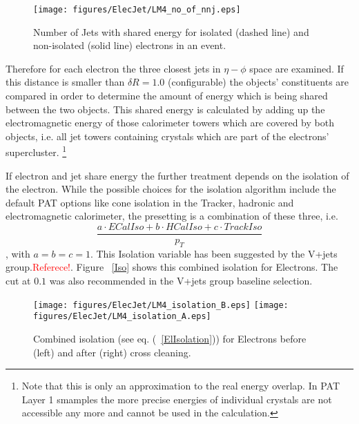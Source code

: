 \documentclass{cmspaper}
\begin{document}
\begin{figure}[hbtp]
  \begin{center}
    \texttt{[image: figures/ElecJet/LM4\_no\_of\_nnj.eps]}
    \caption{Number of Jets with shared energy for isolated (dashed line) and non-isolated (solid line) electrons in an event.}
    \label{fig:NbJets}
  \end{center}
\end{figure}

Therefore for each electron the three closest jets in \( \eta-\phi\) space are
examined. If this distance is smaller than $\delta R=1.0$ (configurable) the
objects' constituents are compared in order to determine the amount of energy
which is being shared between the two objects.
This shared energy is calculated by adding up the electromagnetic energy of
those calorimeter towers which are covered by both objects, i.e. all jet towers
containing crystals which are part of the electrons' supercluster.
\footnote{Note that this is only an approximation to the real energy overlap. In
PAT Layer 1 smamples the more precise energies of individual crystals are not
accessible any more and cannot be used in the calculation.}

If electron and jet share energy the further treatment depends on the isolation
of the electron. While the possible choices for the isolation algorithm include
the default PAT options like cone isolation in the Tracker, hadronic and
electromagnetic calorimeter, the presetting is a combination of these three, i.e. 
\begin{equation}
    \frac{a\cdot ECalIso+b\cdot HCalIso+c\cdot TrackIso}{p_T}
    \label{ElIsolation}
\end{equation}
, with \(a=b=c=1\). This Isolation variable has been suggested by the V+jets
group.\textcolor{red}{Referece!}. Figure ~\ref{Iso} shows this combined
isolation for Electrons. The cut at \(0.1\) was also recommended in the V+jets
group baseline selection. \\

\begin{figure}[hbtp]
  \begin{center}
    \texttt{[image: figures/ElecJet/LM4\_isolation\_B.eps]}
    \texttt{[image: figures/ElecJet/LM4\_isolation\_A.eps]}
    \caption{Combined isolation (see eq. (~\ref{ElIsolation})) for Electrons before (left) and after (right) cross cleaning.}
    \label{fig:ElectronIsolation}
  \end{center}
\end{figure}
\end{document}
